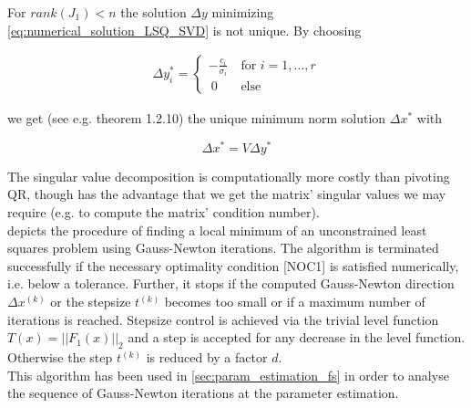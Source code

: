 \documentclass{scrartcl}[12pt, halfparskip]
\numberwithin{equation}{section}
\numberwithin{figure}{section}
\numberwithin{table}{section}
\begin{document}
\begin{itemize}
	For $rank(J_1) < n$ the solution $\Delta y$ minimizing \cref{eq:numerical_solution_LSQ_SVD} is not unique. By choosing
	
	\begin{align}
		\Delta y_i^* = 
		\begin{cases}
			- \frac{c_i}{\sigma_i} \ & \text{for } i=1,...,r \\
			\ 0 \ & \text{else}
		\end{cases}
	\end{align}
	
	we get (see e.g. \cite{numerical_methods_lsq_Bjorck} theorem 1.2.10) the unique minimum norm solution  $\Delta x^*$ with
	
	\begin{equation}
		\Delta x^* = V \Delta y^*
	\end{equation}

\end{itemize}

The singular value decomposition is computationally more costly than pivoting QR, though has the advantage that we get the matrix' singular values we may require (e.g. to compute the matrix' condition number). \\

 depicts the procedure of finding a local minimum of an unconstrained least squares problem using Gauss-Newton iterations. The algorithm is terminated successfully if the necessary optimality condition [NOC1] is satisfied numerically, i.e. below a tolerance. Further, it stops if the computed Gauss-Newton direction $\Delta x^{(k)}$ or the stepsize $t^{(k)}$ becomes too small or if a maximum number of iterations is reached. Stepsize control is achieved via the trivial level function $T(x) = ||F_1(x)||_2$ and a step is accepted for any decrease in the level function. Otherwise the step $t^{(k)}$ is reduced by a factor $d$. \\
This algorithm has been used in \cref{sec:param_estimation_fs} in order to analyse the sequence of Gauss-Newton iterations at the parameter estimation.  \\
\end{document}
